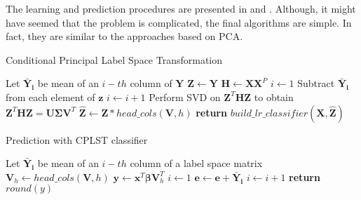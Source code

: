 The learning and prediction procedures are presented in  and . Although, it might have seemed that the problem is complicated, the final algorithms are simple. In fact, they are similar to the approaches based on PCA. 

\begin{algorithm}
    \caption{Conditional Principal Label Space Transformation}\label{alg:cplst1}
    \begin{algorithmic}[1]
            \State Let $\boldsymbol{\bar{Y}_i}$ be mean of an $i-th$ column of $\boldsymbol{Y}$
            \State $\boldsymbol{Z} \gets \boldsymbol{Y}$
            \State $\boldsymbol{H} \gets \boldsymbol{X}\boldsymbol{X}^P$
            \State $i \gets 1$
                \State Subtract $\boldsymbol{\bar{Y}_i}$ from each element of $\boldsymbol{z}$ 
                \State $i \gets i+1$ 
            \EndFor
            \State Perform SVD on $\boldsymbol{Z}^T\boldsymbol{H}\boldsymbol{Z}$ to obtain $\boldsymbol{Z}^T\boldsymbol{H}\boldsymbol{Z}=\boldsymbol{U}\boldsymbol{\Sigma} \boldsymbol{V}^T$
            \State $\boldsymbol{\hat{Z}} \gets \boldsymbol{Z} * head\_cols(\boldsymbol{V},h)$
            \State \textbf{return} $build\_lr\_classifier(\boldsymbol{X}, \boldsymbol{\hat{Z}})$
        \EndFunction
    \end{algorithmic}
\end{algorithm}


\begin{algorithm}
    \caption{Prediction with CPLST classifier}\label{alg:cplst2}
    \begin{algorithmic}[1]
            \State Let $\boldsymbol{\bar{Y}_i}$ be mean of an $i-th$ column of a label space matrix
            \State $\boldsymbol{V}_h \gets head\_cols(\boldsymbol{V}, h)$
            \State $\boldsymbol{y} \gets \boldsymbol{x}^T\boldsymbol{\beta}\boldsymbol{V}_h^T$
            \State $i \gets 1$
            \State $\boldsymbol{e} \gets \boldsymbol{e} + \boldsymbol{\bar{Y}_i}$
                \State $i \gets i+1$
            \EndFor
            \State \textbf{return} $round(y)$
        \EndFunction
    \end{algorithmic}
\end{algorithm}
